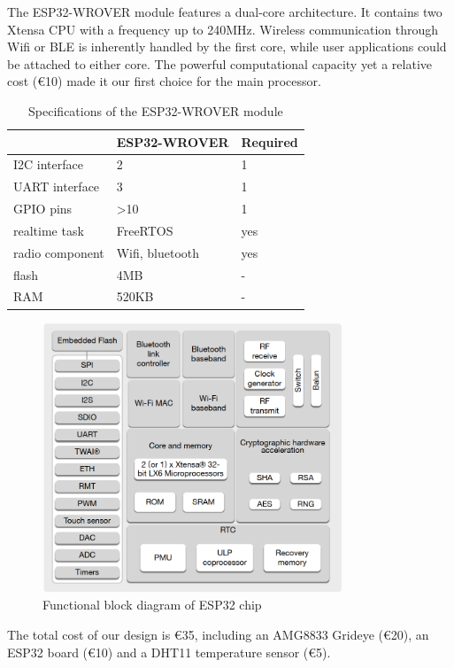 The ESP32-WROVER module features a dual-core architecture. It contains two Xtensa CPU \cite{xtensa} with a frequency up to 240MHz. Wireless communication through Wifi or BLE is inherently handled by the first core, while user applications could be attached to either core. The powerful computational capacity yet a relative cost (€10) made it our first choice for the main processor.
\begin{table}
  \centering
\begin{tabular}{l|ll}
                & ESP32-WROVER     & Required \\ \hline
I2C interface   & 2                & 1        \\
UART interface  & 3                & 1        \\
GPIO pins       & \textgreater{}10 & 1        \\
realtime task   & FreeRTOS         & yes      \\
radio component & Wifi, bluetooth  & yes      \\
flash           & 4MB              & -        \\
RAM             & 520KB            & -
\end{tabular}
  \caption{Specifications of the ESP32-WROVER module}\label{tab:esp32wrover}
\end{table}
\begin{figure}
  \centering
  \includegraphics[width=0.8\textwidth]{figures/ESP32diagram.PNG}
  \caption{Functional block diagram of ESP32 chip}\label{fig:ESP32diagram}
\end{figure}


The total cost of our design is €35, including an AMG8833 Grideye (€20), an ESP32 board (€10) and a DHT11 temperature sensor (€5).

